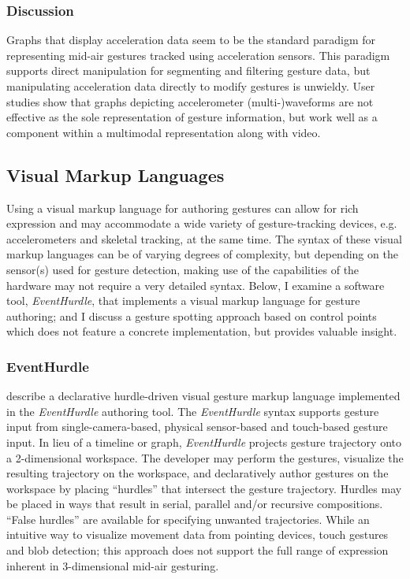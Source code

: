 \subsubsection{Discussion}

Graphs that display acceleration data seem to be the standard paradigm for representing mid-air gestures tracked using acceleration sensors. This paradigm supports direct manipulation for segmenting and filtering gesture data, but manipulating acceleration data directly to modify gestures is unwieldy. User studies show that graphs depicting accelerometer (multi-)waveforms are not effective as the sole representation of gesture information, but work well as a component within a multimodal representation along with video.

\subsection{Visual Markup Languages}

Using a visual markup language for authoring gestures can allow for rich expression and may accommodate a wide variety of gesture-tracking devices, e.g. accelerometers and skeletal tracking, at the same time. The syntax of these visual markup languages can be of varying degrees of complexity, but depending on the sensor(s) used for gesture detection, making use of the capabilities of the hardware may not require a very detailed syntax. Below, I examine a software tool, \emph{EventHurdle}, that implements a visual markup language for gesture authoring; and I discuss a gesture spotting approach based on control points which does not feature a concrete implementation, but provides valuable insight.

\subsubsection{EventHurdle}

\textcite{Kim:2013} describe a declarative hurdle-driven visual gesture markup language implemented in the \emph{EventHurdle} authoring tool. The \emph{EventHurdle} syntax supports gesture input from single-camera-based, physical sensor-based and touch-based gesture input. In lieu of a timeline or graph, \emph{EventHurdle} projects gesture trajectory onto a 2-dimensional workspace. The developer may perform the gestures, visualize the resulting trajectory on the workspace, and declaratively author gestures on the workspace by placing “hurdles” that intersect the gesture trajectory. Hurdles may be placed in ways that result in serial, parallel and/or recursive compositions. “False hurdles” are available for specifying unwanted trajectories. While an intuitive way to visualize movement data from pointing devices, touch gestures and blob detection; this approach does not support the full range of expression inherent in 3-dimensional mid-air gesturing.

